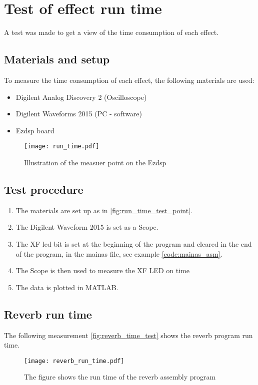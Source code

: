 \chapter{Test of effect run time}\label{app:effect_run_time}
A test was made to get a view of the time consumption of each effect.

\section*{Materials and setup}
To measure the time consumption of each effect, the following materials are used:
\begin{itemize}
\item Digilent Analog Discovery 2 (Oscilloscope)
\item Digilent Waveforms 2015 (PC - software)
\item Ezdsp board
\end{itemize}


\begin{figure}[htbp!]
	\centering
		\texttt{[image: run\_time.pdf]}
		\caption{Illustration of the measuer point on the Ezdsp}
		\label{fig:run_time_test_point}
\end{figure}


\section*{Test procedure}
\begin{enumerate}
\item The materials are set up as in \autoref{fig:run_time_test_point}.
\item The Digilent Waveform 2015 is set as a Scope.
\item  The XF led bit is set at the beginning of the program and cleared in the end of the program, in the mainas file, see example \autoref{code:mainas_asm}.
\item  The Scope is then used to measure the XF LED on time 
\item The data is plotted in MATLAB.
\end{enumerate}

\section*{Reverb run time}
The following measurement \autoref{fig:reverb_time_test} shows the \gls{reverb} program run time.
\begin{figure}[htbp!]
	\centering
		\texttt{[image: reverb\_run\_time.pdf]}
		\caption{The figure shows the run time of the \gls{reverb} assembly program}
		\label{fig:reverb_time_test}
\end{figure}